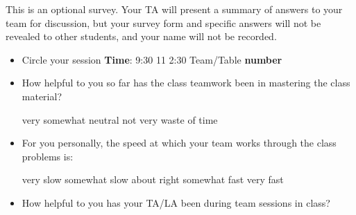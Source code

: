 \documentclass[handout]{mcs}
\begin{document}

This is an optional survey.  Your TA will present a summary of answers
to your team for discussion, but your survey form and specific answers
will not be revealed to other students, and your name will not be
recorded.

\begin{itemize}

\item 
Circle your session \textbf{Time}: \hspace{0.4in} 9:30 \hspace{0.4in}
11 \hspace{0.4in} 2:30 \hspace{0.5in} Team/Table \textbf{number}\examrule[0.5in]

\iffalse

\item Would you like the staff (Meyer/TA/LA) to present solutions to
  selected problems in class after your team has finished working on
  them?
\begin{center}
YES \hspace{1in} NO
\end{center}
\fi

\item How helpful to you so far has the class teamwork been in
  mastering the class material?

\begin{center}
very\hspace{0.5in} somewhat \hspace{0.5in} neutral\hspace{0.5in} not
very \hspace{0.5in} waste of time
\end{center}

\item For you personally, the speed at which your team works through
  the class problems is:

\begin{center}
very slow\hspace{0.4in} somewhat slow\hspace{0.4in} about
right\hspace{0.4in} somewhat fast\hspace{0.4in} very fast
\end{center}

\item How helpful to you has your TA/LA been during team sessions in class?


\end{itemize}
\end{document}
